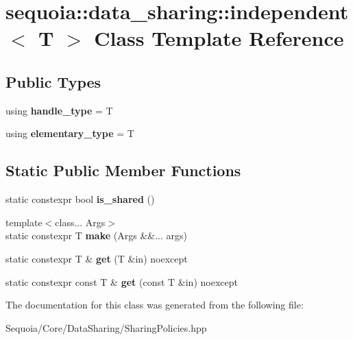 \hypertarget{classsequoia_1_1data__sharing_1_1independent}{}\section{sequoia\+::data\+\_\+sharing\+::independent$<$ T $>$ Class Template Reference}
\label{classsequoia_1_1data__sharing_1_1independent}
\subsection*{Public Types}
\begin{DoxyCompactItemize}
\item 
\mbox{\label{classsequoia_1_1data__sharing_1_1independent_a14ea1054e39f23535088c2620b844fc4}} 
using {\bfseries handle\+\_\+type} = T
\item 
\mbox{\label{classsequoia_1_1data__sharing_1_1independent_a5ff719552bec9cc4acbd74a007217a12}} 
using {\bfseries elementary\+\_\+type} = T
\end{DoxyCompactItemize}
\subsection*{Static Public Member Functions}
\begin{DoxyCompactItemize}
\item 
\mbox{\label{classsequoia_1_1data__sharing_1_1independent_add3273f2e8eb545fe9425fd5937b8591}} 
static constexpr bool {\bfseries is\+\_\+shared} ()
\item 
\mbox{\label{classsequoia_1_1data__sharing_1_1independent_a2d6ed5ad84aeab476f7a07313938a2f6}} 
{\footnotesize template$<$class... Args$>$ }\\static constexpr T {\bfseries make} (Args \&\&... args)
\item 
\mbox{\label{classsequoia_1_1data__sharing_1_1independent_a75c1aabc6f8a3d39ddb3fd660cd8c34c}} 
static constexpr T \& {\bfseries get} (T \&in) noexcept
\item 
\mbox{\label{classsequoia_1_1data__sharing_1_1independent_a735bbc097a7d557f1cd1b82b3923f694}} 
static constexpr const T \& {\bfseries get} (const T \&in) noexcept
\end{DoxyCompactItemize}


The documentation for this class was generated from the following file\+:\begin{DoxyCompactItemize}
\item 
Sequoia/\+Core/\+Data\+Sharing/Sharing\+Policies.\+hpp\end{DoxyCompactItemize}
